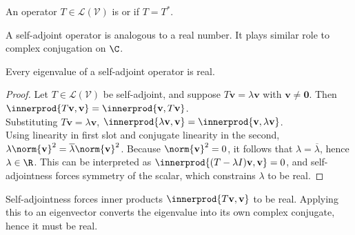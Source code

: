 \begin{definition} An operator $T \in \mathcal{L}(\mathcal{V})$ is  or  if $T = T^*$.
\end{definition}

A self-adjoint operator is analogous to a real number. It plays similar role to complex conjugation on $\C$.

\begin{proposition} Every eigenvalue of a self-adjoint operator is real.
\begin{proof} Let $T \in \mathcal{L}(\mathcal{V})$ be self-adjoint, and suppose $T\mathbf{v} = \lambda \mathbf{v}$ with $\mathbf{v} \neq \mathbf{0}$. Then $\innerprod{T \mathbf{v}, \mathbf{v}} = \innerprod{\mathbf{v}, T \mathbf{v}}$.\\
Substituting $T \mathbf{v} = \lambda \mathbf{v}$, $\innerprod{\lambda \mathbf{v}, \mathbf{v}} = \innerprod{\mathbf{v}, \lambda \mathbf{v}}$.\\
Using linearity in first slot and conjugate linearity in the second, $\lambda \norm{\mathbf{v}}^2 = \overline{\lambda} \norm{\mathbf{v}}^2$. Because $\norm{\mathbf{v}}^2 = 0$, it follows that $\lambda = \overline{\lambda}$, hence $\lambda \in \R$. This can be interpreted as $\innerprod{(T - \lambda I)\mathbf{v}, \mathbf{v}} = 0$, and self-adjointness forces symmetry of the scalar, which constrains $\lambda$ to be real.	
\end{proof}
\end{proposition}

Self-adjointness forces inner products $\innerprod{T \mathbf{v}, \mathbf{v}}$ to be real. Applying this to an eigenvector converts the eigenvalue into its own complex conjugate, hence it must be real.

